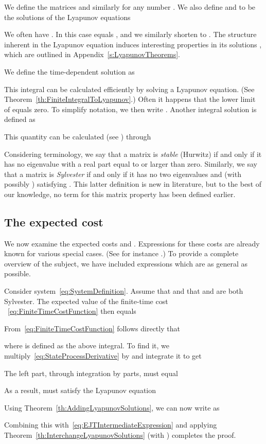\documentclass[twocolumn]{autart}
\begin{document}
We define the matrices  and similarly \mbox{} for any number . We also define  and  to be the solutions of the Lyapunov equations

We often have . In this case  equals , and we similarly shorten  to . The structure inherent in the Lyapunov equation induces interesting properties in its solutions , which are outlined in Appendix~\ref{s:LyapunovTheorems}.

We define the time-dependent solution  as

This integral can be calculated efficiently by solving a Lyapunov equation. (See Theorem~\ref{th:FiniteIntegralToLyapunov}.) Often it happens that the lower limit  of  equals zero. To simplify notation, we then write . Another integral solution  is defined as

This quantity can be calculated (see \cite{MatrixExponentials}) through

Considering terminology, we say that a matrix  is \textit{stable} (Hurwitz) if and only if it has no eigenvalue  with a real part equal to or larger than zero. Similarly, we say that a matrix  is \textit{Sylvester} if and only if it has no two eigenvalues  and  (with possibly ) satisfying . This latter definition is new in literature, but to the best of our knowledge, no term for this matrix property has been defined earlier.

\subsection{The expected cost}

We now examine the expected costs  and . Expressions for these costs are already known for various special cases. (See for instance \cite{DMCSBook,StochasticControlBook}.) To provide a complete overview of the subject, we have included expressions which are as general as possible.

\begin{thm}\label{th:FiniteTimeCostMean}
Consider system~\eqref{eq:SystemDefinition}. Assume that  and that  and  are both Sylvester. The expected value  of the finite-time cost ~\eqref{eq:FiniteTimeCostFunction} then equals

\end{thm}
\begin{pf}
From~\eqref{eq:FiniteTimeCostFunction} follows directly that

where  is defined as the above integral. To find it, we multiply~\eqref{eq:StateProcessDerivative} by  and integrate it to get

The left part, through integration by parts, must equal

As a result,  must satisfy the Lyapunov equation

Using Theorem~\ref{th:AddingLyapunovSolutions}, we can now write  as

Combining this with~\eqref{eq:EJTIntermediateExpression} and applying Theorem~\ref{th:InterchangeLyapunovSolutions} (with ) completes the proof.
\end{pf}
\end{document}
